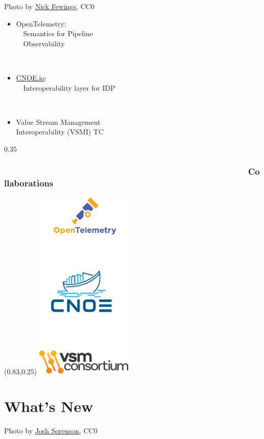 \documentclass[aspectratio=169,11pt,hyperref={colorlinks=true}]{beamer}
\begin{document}
\begin{lpicrblack}{%
  Photo by \href{https://unsplash.com/@jannerboy62}{\underline{Nick Fewings}}, CC0
  }%
  {%
  \begin{itemize}
    \item OpenTelemetry:\\
          ~~Semantics for Pipeline\\~~Observability
  \end{itemize}
  ~ \\
  \begin{itemize}
    \item \href{https://cnoe.io}{CNOE.io}:\\
          ~~Interoperability layer for IDP
  \end{itemize}
  ~ \\
  \begin{itemize}
    \item Value Stream Management\\
          Interoperability (VSMI) TC
  \end{itemize}
  }%
  {0.35}
  \frametitle{~~~~~~~~~~~~~~~~~~~~~~~~~~~~~~~~~~~~~~~~~~~~~~~~~~~Collaborations}
  \begin{textblock*}{0.15\paperwidth}(0.83\paperwidth,0.25\paperheight)
    \includegraphics[width=0.15\paperwidth]{img/cdevents-Collaborations.png}
  \end{textblock*}
\end{lpicrblack}

\section{What's New}
\begin{sectionwithpiclargecentral}{Photo by \href{https://unsplash.com/@joshsorenson}{\underline{Josh Sorenson}}, CC0}
\end{sectionwithpiclargecentral}
\end{document}
